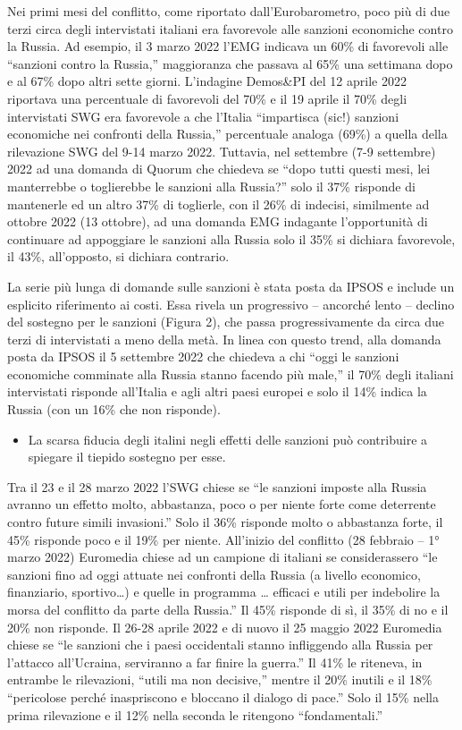 \documentclass[
  openany]{book}
\providecommand{\tightlist}{%
  \setlength{\itemsep}{0pt}\setlength{\parskip}{0pt}}
\begin{document}
Nei primi mesi del conflitto, come riportato dall'Eurobarometro, poco più di due terzi circa degli intervistati italiani era favorevole alle sanzioni economiche contro la Russia. Ad esempio, il 3 marzo 2022 l'EMG indicava un 60\% di favorevoli alle ``sanzioni contro la Russia,'' maggioranza che passava al 65\% una settimana dopo e al 67\% dopo altri sette giorni. L'indagine Demos\&PI del 12 aprile 2022 riportava una percentuale di favorevoli del 70\% e il 19 aprile il 70\% degli intervistati SWG era favorevole a che l'Italia ``impartisca (sic!) sanzioni economiche nei confronti della Russia,'' percentuale analoga (69\%) a quella della rilevazione SWG del 9-14 marzo 2022. Tuttavia, nel settembre (7-9 settembre) 2022 ad una domanda di Quorum che chiedeva se ``dopo tutti questi mesi, lei manterrebbe o toglierebbe le sanzioni alla Russia?'' solo il 37\% risponde di mantenerle ed un altro 37\% di toglierle, con il 26\% di indecisi, similmente ad ottobre 2022 (13 ottobre), ad una domanda EMG indagante l'opportunità di continuare ad appoggiare le sanzioni alla Russia solo il 35\% si dichiara favorevole, il 43\%, all'opposto, si dichiara contrario.

La serie più lunga di domande sulle sanzioni è stata posta da IPSOS e include un esplicito riferimento ai costi. Essa rivela un progressivo -- ancorché lento -- declino del sostegno per le sanzioni (Figura 2), che passa progressivamente da circa due terzi di intervistati a meno della metà. In linea con questo trend, alla domanda posta da IPSOS il 5 settembre 2022 che chiedeva a chi ``oggi le sanzioni economiche comminate alla Russia stanno facendo più male,'' il 70\% degli italiani intervistati risponde all'Italia e agli altri paesi europei e solo il 14\% indica la Russia (con un 16\% che non risponde).

\begin{itemize}
\tightlist
\item
  La scarsa fiducia degli italini negli effetti delle sanzioni può contribuire a spiegare il tiepido sostegno per esse.
\end{itemize}

Tra il 23 e il 28 marzo 2022 l'SWG chiese se ``le sanzioni imposte alla Russia avranno un effetto molto, abbastanza, poco o per niente forte come deterrente contro future simili invasioni.'' Solo il 36\% risponde molto o abbastanza forte, il 45\% risponde poco e il 19\% per niente. All'inizio del conflitto (28 febbraio -- 1° marzo 2022) Euromedia chiese ad un campione di italiani se considerassero ``le sanzioni fino ad oggi attuate nei confronti della Russia (a livello economico, finanziario, sportivo\ldots) e quelle in programma \ldots{} efficaci e utili per indebolire la morsa del conflitto da parte della Russia.'' Il 45\% risponde di sì, il 35\% di no e il 20\% non risponde. Il 26-28 aprile 2022 e di nuovo il 25 maggio 2022 Euromedia chiese se ``le sanzioni che i paesi occidentali stanno infliggendo alla Russia per l'attacco all'Ucraina, serviranno a far finire la guerra.'' Il 41\% le riteneva, in entrambe le rilevazioni, ``utili ma non decisive,'' mentre il 20\% inutili e il 18\% ``pericolose perché inaspriscono e bloccano il dialogo di pace.'' Solo il 15\% nella prima rilevazione e il 12\% nella seconda le ritengono ``fondamentali.''
\end{document}
